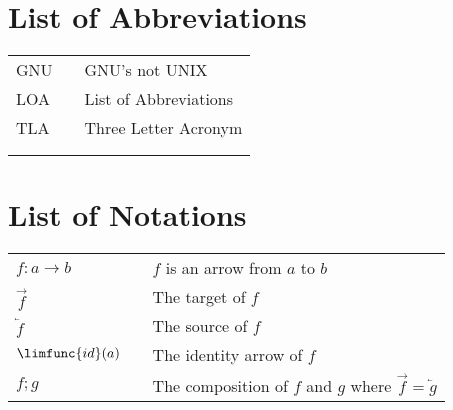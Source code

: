 %

%

\lstlistoflistings%

%

\chapter*{List of Abbreviations}%
\begin{tabular}[t]{lll}
GNU & \qquad \qquad & GNU's not UNIX \\ 
LOA &  & List of Abbreviations \\ 
TLA &  & Three Letter Acronym \\ 
&  &  \\ 
&  & 
\end{tabular}

\chapter*{List of Notations}%
\begin{tabular}[t]{lll}
$f:a\rightarrow b$ & \qquad \qquad & $f$ is an arrow from $a$ to $b$ \\ 
$\overrightarrow{f}$ &  & The target of $f$ \\ 
$\overleftarrow{f}$ &  & The source of $f$ \\ 
$\limfunc{id}(a)$ &  & The identity arrow of $f$ \\ 
$f;g$ &  & The composition of $f$ and $g$ where $\overrightarrow{f}=%
\overleftarrow{g}$%
\end{tabular}
